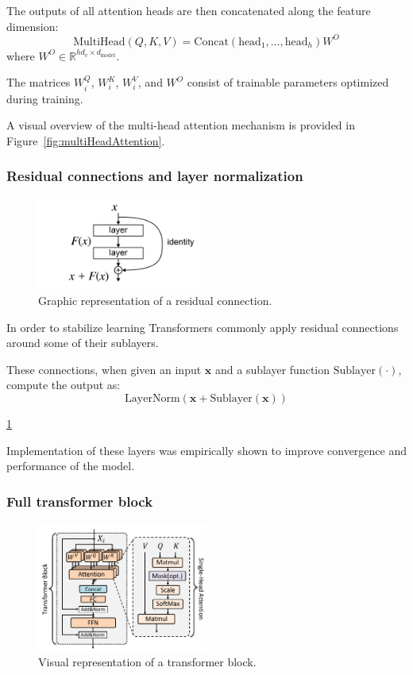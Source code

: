 \documentclass{pracalicmgr}
\begin{document}
The outputs of all attention heads are then concatenated along the feature dimension:
\[
\text{MultiHead}(Q, K, V) = \text{Concat}(\text{head}_1, \ldots, \text{head}_h)W^O
\]
where \( W^O \in \mathbb{R}^{hd_v \times d_{\text{model}}} \).

The matrices \( W^Q_i \), \( W^K_i \), \( W^V_i \), and \( W^O \) consist of trainable parameters optimized during training.

A visual overview of the multi-head attention mechanism is provided in Figure~\ref{fig:multiHeadAttention}.

\subsubsection{Residual connections and layer normalization}

\begin{figure}[h]
    \centering
    \includegraphics[width=0.5\textwidth]{src/ResBlock.png}
    \caption{Graphic representation of a residual connection\cite{resConn}.}
    \label{fig:resCon}
\end{figure}

In order to stabilize learning Transformers commonly apply residual connections around some of their sublayers.

These connections, when given an input \( \mathbf{x} \) and a sublayer function \( \text{Sublayer}(\cdot) \), compute the output as:
\[
\text{LayerNorm}(\mathbf{x} + \text{Sublayer}(\mathbf{x}))
\]

\ref{fig:resCon}

Implementation of these layers was empirically shown to improve convergence and performance of the model.


\subsubsection{Full transformer block}

\begin{figure}[h]
    \centering
    \includegraphics[width=0.5\textwidth]{src/transformerBlockSingle.pdf}
    \caption{Visual representation of a transformer block. \cite{transformerBlockSingle}}
    \label{fig:transformerEncoder}
\end{figure}
\end{document}
